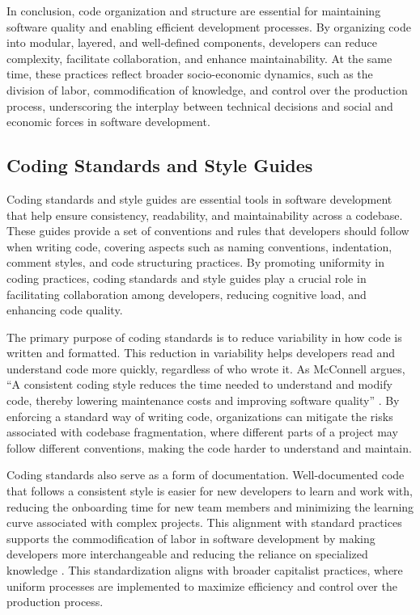 \begin{refsection}
In conclusion, code organization and structure are essential for maintaining software quality and enabling efficient development processes. By organizing code into modular, layered, and well-defined components, developers can reduce complexity, facilitate collaboration, and enhance maintainability. At the same time, these practices reflect broader socio-economic dynamics, such as the division of labor, commodification of knowledge, and control over the production process, underscoring the interplay between technical decisions and social and economic forces in software development.

\subsection{Coding Standards and Style Guides}

Coding standards and style guides are essential tools in software development that help ensure consistency, readability, and maintainability across a codebase. These guides provide a set of conventions and rules that developers should follow when writing code, covering aspects such as naming conventions, indentation, comment styles, and code structuring practices. By promoting uniformity in coding practices, coding standards and style guides play a crucial role in facilitating collaboration among developers, reducing cognitive load, and enhancing code quality.

The primary purpose of coding standards is to reduce variability in how code is written and formatted. This reduction in variability helps developers read and understand code more quickly, regardless of who wrote it. As McConnell argues, “A consistent coding style reduces the time needed to understand and modify code, thereby lowering maintenance costs and improving software quality” \cite[pp.~89-91]{McConnell2004}. By enforcing a standard way of writing code, organizations can mitigate the risks associated with codebase fragmentation, where different parts of a project may follow different conventions, making the code harder to understand and maintain.

Coding standards also serve as a form of documentation. Well-documented code that follows a consistent style is easier for new developers to learn and work with, reducing the onboarding time for new team members and minimizing the learning curve associated with complex projects. This alignment with standard practices supports the commodification of labor in software development by making developers more interchangeable and reducing the reliance on specialized knowledge \cite[pp.~120-123]{Pfleeger2010}. This standardization aligns with broader capitalist practices, where uniform processes are implemented to maximize efficiency and control over the production process.


\end{refsection}
